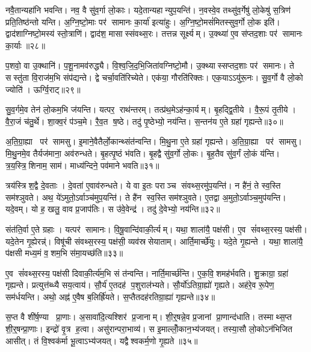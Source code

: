 नवै॒तान्यहा॑नि भवन्ति। नव॒ वै सु॑व॒र्गा लो॒काः। यदे॒तान्यहान्युप॒यन्ति॑। न॒वस्वे॒व तथ्सु॑व॒र्गेषु॑ लो॒केषु॑ स॒त्रिण॑ प्रति॒तिष्ठ॑न्तो यन्ति। अ॒ग्नि॒ष्टो॒माः पर॑ सामानः का॒र्या॑ इत्या॑हुः। अ॒ग्नि॒ष्टो॒मसं॑मितस्सुव॒र्गो लो॒क इति॑। द्वाद॑शाग्निष्टो॒मस्य॑ स्तो॒त्राणि॑। द्वाद॑श॒ मासास्संवथ्स॒रः। तत्तन्न सूर्क्ष्यम्। उ॒क्थ्या॑ ए॒व स॑प्तद॒शाः पर॑ सामानः का॒र्याः॥२८॥

प॒शवो॒ वा उ॒क्थानि॑। प॒शू॒नामव॑रुद्ध्यै। वि॒श्व॒जि॒द॒भि॒जिता॑वग्निष्टो॒मौ। उ॒क्थ्यास्सप्तद॒शाः पर॑ समानः। ते सस्तु॑ता वि॒राज॑म॒भि संप॑द्यन्ते। द्वे चर्चा॒वति॑रिच्येते। एक॑या॒ गौरति॑रिक्तः। एक॒याऽऽयु॑रू॒नः। सु॒व॒र्गो वै लो॒को ज्योति॑। ऊर्ग्वि॒राट्॥२९॥

सु॒व॒र्गमे॒व तेन॑ लो॒कम॒भि ज॑यन्ति। यत्पर॒ राथ॑न्तरम्। तत्प्र॑थ॒मेऽह॑न्का॒र्यम्। बृ॒हद्द्वि॒तीये। वै॒रू॒पं तृ॒तीये। वै॒रा॒जं च॑तु॒र्थे। शा॒क्व॒रं प॑ञ्च॒मे। रै॒व॒त ष॒ष्ठे। तदु॑ पृ॒ष्ठेभ्यो॒ नय॑न्ति। स॒न्तन॑य ए॒ते ग्रहा॑ गृह्यन्ते॥३०॥

अ॒ति॒ग्रा॒ह्या पर॑ सामसु। इ॒माने॒वैतैर्लो॒कान्थ्संत॑न्वन्ति। मि॒थु॒ना ए॒ते ग्रहा॑ गृह्यन्ते। अ॒ति॒ग्रा॒ह्या पर॑ सामसु। मि॒थु॒नमे॒व तैर्यज॑माना॒ अव॑रुन्धते। बृ॒हत्पृ॒ष्ठं भ॑वति। बृ॒हद्वै सु॑व॒र्गो लो॒कः। बृ॒ह॒तैव सु॑व॒र्गं लो॒कं य॑न्ति। त्र॒य॒स्त्रि॒शिनाम॒ साम॑। माध्य॑न्दिने॒ पव॑माने भवति॥३१॥

त्रय॑स्त्रिश॒द्वै दे॒वताः। दे॒वता॑ ए॒वाव॑रुन्धते। ये वा इ॒तः पराञ्च संवथ्स॒रमु॑प॒यन्ति॑। न है॑नं॒ ते स्व॒स्ति सम॑श्ञुवते। अथ॒ ये॑ऽमुतो॒ऽर्वाञ्च॑मुप॒यन्ति॑। ते है॑न स्व॒स्ति सम॑श्ञुवते। ए॒तद्वा अ॒मुतो॒ऽर्वाञ्च॒मुप॑यन्ति। यदे॒वम्। यो ह॒ खलु॒ वाव प्र॒जाप॑तिः। स उ॑वे॒वेन्द्र॑। तदु॑ दे॒वेभ्यो॒ नय॑न्ति॥३२॥\anuvakamend[का॒र्या॑ वि॒राड्गृ॑ह्यन्ते॒ पव॑माने भव॒तीन्द्र॒ एकं॑ च]

संत॑ति॒र्वा ए॒ते ग्रहाः। यत्पर॑ सामानः। वि॒षू॒वान्दि॑वाकी॒र्त्यम्। यथा॒ शाला॑यै॒ पक्ष॑सी। ए॒व सं॑वथ्स॒रस्य॒ पक्ष॑सी। यदे॒तेन गृ॒ह्येरन्न्॑। विषू॑ची संवथ्स॒रस्य॒ पक्ष॑सी॒ व्यव॑स्रसेयाताम्। आर्ति॒मार्च्छे॑युः। यदे॒ते गृ॒ह्यन्ते। यथा॒ शाला॑यै॒ प॑क्षसी मध्य॒मं व॒शम॒भि स॑मा॒यच्छ॑ति॥३३॥

ए॒व सं॑वथ्स॒रस्य॒ पक्ष॑सी दिवाकी॒र्त्य॑म॒भि सं त॑न्वन्ति। नार्ति॒मार्च्छ॑न्ति। ए॒क॒वि॒शमह॑र्भवति। शु॒क्राग्रा॒ ग्रहा॑ गृह्यन्ते। प्रत्युत्त॑ब्ध्यै सय॒त्वाय॑। सौ॒र्य॑ ए॒तदह॑ प॒शुराल॑भ्यते। सौ॒र्यो॑ऽतिग्रा॒ह्यो॑ गृह्यते। अह॑रे॒व रू॒पेण॒ सम॑र्धयन्ति। अथो॒ अह्न॑ ए॒वैष ब॒लिर्ह्रि॑यते। स॒प्तैतदह॑रतिग्रा॒ह्या॑ गृह्यन्ते॥३४॥

स॒प्त वै शी॑र्\mbox{}ष॒ण्या प्रा॒णाः। अ॒सावा॑दि॒त्यश्शिर॑ प्र॒जानाम्। शी॒र्॒षन्ने॒व प्र॒जानां प्रा॒णान्द॑धाति। तस्माथ्स॒प्त शी॒र्॒षन्प्रा॒णाः। इन्द्रो॑ वृ॒त्र ह॒त्वा। असु॑रान्परा॒भाव्य॑। स इ॒माल्लोँ॒कान॒भ्य॑जयत्। तस्या॒सौ लो॒कोऽन॑भिजित आसीत्। तं वि॒श्वक॑र्मा भू॒त्वाऽभ्य॑जयत्। यद्वैश्वकर्म॒णो गृ॒ह्यते॥३५॥


